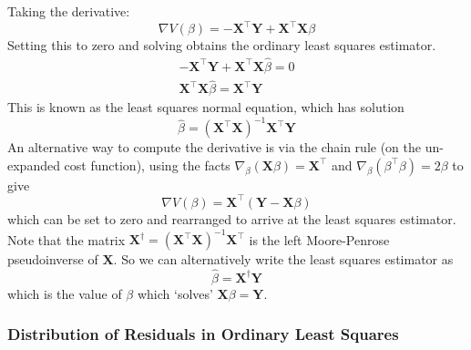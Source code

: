 \documentclass[11pt]{report} %
\begin{document}
Taking the derivative:
\begin{equation}
\nabla V\left(\beta\right) = -\mathbf{X}^{\top}\mathbf{Y} + \mathbf{X}^{\top}\mathbf{X}\beta
\end{equation}
Setting this to zero and solving obtains the ordinary least squares estimator.
\begin{gather}
-\mathbf{X}^{\top}\mathbf{Y} + \mathbf{X}^{\top}\mathbf{X}\hat{\beta} = 0 \\
\mathbf{X}^{\top}\mathbf{X}\hat{\beta} = \mathbf{X}^{\top}\mathbf{Y}
\end{gather}
This is known as the least squares normal equation, which has solution
\begin{equation}
\hat{\beta} = \left(\mathbf{X}^{\top}\mathbf{X}\right)^{-1}\mathbf{X}^{\top}\mathbf{Y}
\end{equation}
An alternative way to compute the derivative is via the chain rule (on the un-expanded cost function), using the facts $\nabla_{\beta} \left(\mathbf{X}\beta\right) = \mathbf{X}^{\top}$ and $\nabla_{\beta} \left(\beta^{\top}\beta\right) = 2\beta$ to give
\begin{equation}
\nabla V\left(\beta\right) = \mathbf{X}^{\top}\left(\mathbf{Y} - \mathbf{X}\beta\right)
\end{equation}
which can be set to zero and rearranged to arrive at the least squares estimator. Note that the matrix $\mathbf{X}^{\dagger} = \left(\mathbf{X}^{\top}\mathbf{X}\right)^{-1}\mathbf{X}^{\top}$ is the left Moore-Penrose pseudoinverse of $\mathbf{X}$. So we can alternatively write the least squares estimator as
\begin{equation}
\hat{\beta} = \mathbf{X}^{\dagger}\mathbf{Y}
\end{equation}
which is the value of $\beta$ which `solves' $\mathbf{X}\beta = \mathbf{Y}$.

\subsubsection{Distribution of Residuals in Ordinary Least Squares}
\end{document}
